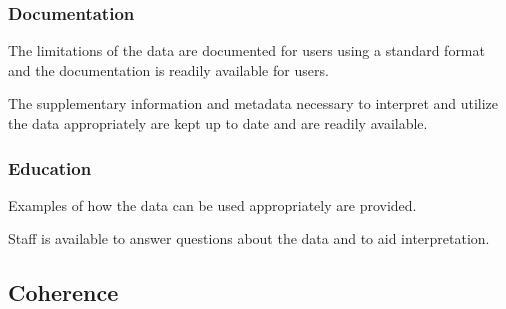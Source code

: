 \subsubsection{Documentation}

\begin{QandA}
    \item The limitations of the data are documented for users using a standard format and the documentation is readily available for users.
    \begin{answered}
        
    \end{answered}

    \item The supplementary information and metadata necessary to interpret and utilize the data appropriately are kept up to date and are readily available.
    \begin{answered}
        
    \end{answered}

\end{QandA}

\subsubsection{Education}

\begin{QandA}
    \item Examples of how the data can be used appropriately are provided.
    \begin{answered}
        
    \end{answered}

    \item Staff is available to answer questions about the data and to aid interpretation.
    \begin{answered}
        
    \end{answered}

\end{QandA}

\subsection{Coherence}

